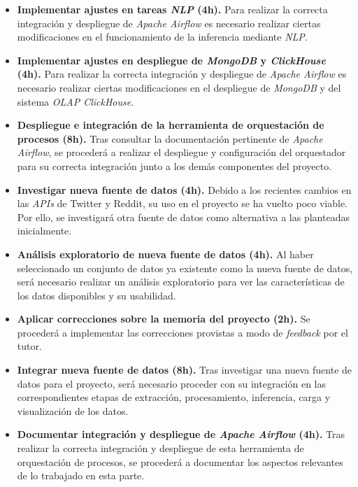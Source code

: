 \begin{itemize}
    \item \textbf{Implementar ajustes en tareas \textit{NLP} (4h).} Para realizar la correcta integración y despliegue de \textit{Apache Airflow} es necesario realizar ciertas modificaciones en el funcionamiento de la inferencia mediante \textit{NLP}.
    
    \item \textbf{Implementar ajustes en despliegue de \textit{MongoDB} y \textit{ClickHouse} (4h).} Para realizar la correcta integración y despliegue de \textit{Apache Airflow} es necesario realizar ciertas modificaciones en el despliegue de \textit{MongoDB} y del sistema \textit{OLAP ClickHouse}.
    
    \item \textbf{Despliegue e integración de la herramienta de orquestación de procesos (8h).} Tras consultar la documentación pertinente de \textit{Apache Airflow}, se procederá a realizar el despliegue y configuración del orquestador para su correcta integración junto a los demás componentes del proyecto.
    
    \item \textbf{Investigar nueva fuente de datos (4h).} Debido a los recientes cambios en las \textit{APIs} de Twitter y Reddit, su uso en el proyecto se ha vuelto poco viable. Por ello, se investigará otra fuente de datos como alternativa a las planteadas inicialmente.

    \item \textbf{Análisis exploratorio de nueva fuente de datos (4h).} Al haber seleccionado un conjunto de datos ya existente como la nueva fuente de datos, será necesario realizar un análisis exploratorio para ver las características de los datos disponibles y su usabilidad.

    \item \textbf{Aplicar correcciones sobre la memoria del proyecto (2h).} Se procederá a implementar las correcciones provistas a modo de \textit{feedback} por el tutor.

    \item \textbf{Integrar nueva fuente de datos (8h).} Tras investigar una nueva fuente de datos para el proyecto, será necesario proceder con su integración en las correspondientes etapas de extracción, procesamiento, inferencia, carga y visualización de los datos.

    \item \textbf{Documentar integración y despliegue de \textit{Apache Airflow} (4h).} Tras realizar la correcta integración y despliegue de esta herramienta de orquestación de procesos, se procederá a documentar los aspectos relevantes de lo trabajado en esta parte.

\end{itemize}

